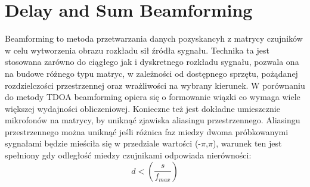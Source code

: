 \documentclass[eng,printmode]{mgr}
\begin{document}
\section{Delay and Sum Beamforming}
Beamforming to metoda przetwarzania danych pozyskancyh z matrycy czujników w celu wytworzenia obrazu rozkładu sił źródła sygnału. Technika ta jest stosowana zarówno do ciągłego jak i dyskretnego rozkładu sygnału, pozwala ona na budowe różnego typu matryc, w zależności od dostępnego sprzętu, pożądanej rozdzielczości przestrzennej oraz wrażliwości na wybrany kierunek. W porównaniu do metody TDOA beamforming opiera się o formowanie wiązki co wymaga wiele większej wydajności obliczeniowej. Konieczne też jest dokładne umieszcznie mikrofonów na matrycy, by uniknąć zjawiska aliasingu przestrzennego.
\newline Aliasingu przestrzennego można uniknąć jeśli różnica faz miedzy dwoma próbkowanymi sygnałami będzie mieściła się w przedziale wartości (-$\pi$,$\pi$), warunek ten jest spełniony gdy odległość miedzy czujnikami odpowiada nierówności:
\begin{equation}
 d <(\frac{s}{f_{max}}) 
\end{equation}
\end{document}
